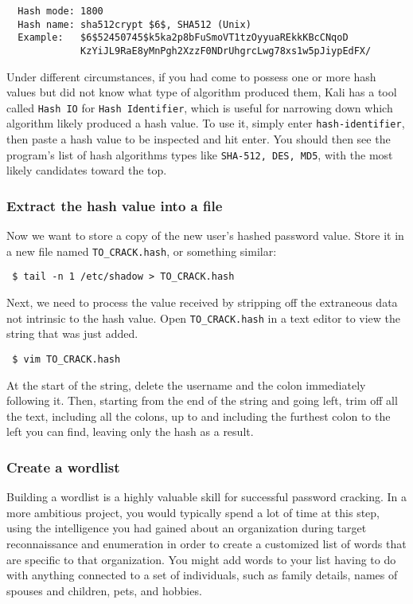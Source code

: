   \begin{verbatim}
  Hash mode: 1800
  Hash name: sha512crypt $6$, SHA512 (Unix)
  Example:   $6$52450745$k5ka2p8bFuSmoVT1tzOyyuaREkkKBcCNqoD
             KzYiJL9RaE8yMnPgh2XzzF0NDrUhgrcLwg78xs1w5pJiypEdFX/
  \end{verbatim}

  Under different circumstances, if you had come to possess one or more hash values but did not know what type of algorithm produced them, Kali has a tool called \verb|Hash IO| for \verb|Hash Identifier|, which is useful for narrowing down which algorithm likely produced a hash value. To use it, simply enter \verb|hash-identifier|, then paste a hash value to be inspected and hit enter. You should then see the program’s list of hash algorithms types like \verb|SHA-512, DES, MD5|, with the most likely candidates toward the top.

\subsubsection{Extract the hash value into a file}
  Now we want to store a copy of the new user’s hashed password value. Store it in a new file named \verb|TO_CRACK.hash|, or something similar:
  \begin{verbatim} $ tail -n 1 /etc/shadow > TO_CRACK.hash \end{verbatim}

  \noindent
  Next, we need to process the value received by stripping off the extraneous data not intrinsic to the hash value. Open \verb|TO_CRACK.hash| in a text editor to view the string that was just added.
  \begin{verbatim} $ vim TO_CRACK.hash \end{verbatim}

  \noindent
  At the start of the string, delete the username and the colon immediately following it. Then, starting from the end of the string and going left, trim off all the text, including all the colons, up to and including the furthest colon to the left you can find, leaving only the hash as a result.

\subsubsection{Create a wordlist}
  Building a wordlist is a highly valuable skill for successful password cracking. In a more ambitious project, you would typically spend a lot of time at this step, using the intelligence you had gained about an organization during target reconnaissance and enumeration in order to create a customized list of words that are specific to that organization. You might add words to your list having to do with anything connected to a set of individuals, such as family details, names of spouses and children, pets, and hobbies.

